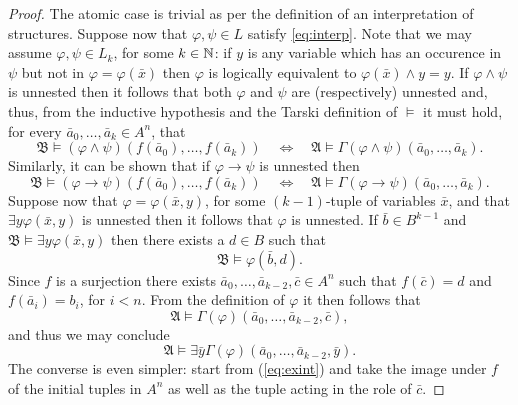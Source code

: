 \begin{proof}
	The atomic case is trivial as per the definition of an interpretation of structures.  Suppose now that $\varphi,\psi\in L$ satisfy \ref{eq:interp}.  Note that we may assume $\varphi,\psi\in L_k$, for some $k\in\mathbb{N}$:  if $y$ is any variable which has an occurence in $\psi$ but not in $\varphi=\varphi(\bar{x})$ then $\varphi$ is logically equivalent to $\varphi(\bar{x})\wedge y=y$.  If $\varphi\wedge\psi$ is unnested then it follows that both $\varphi$ and $\psi$ are (respectively) unnested and, thus, from the inductive hypothesis and the Tarski definition of $\models$ it must hold, for every $\bar{a}_0,\dotsc,\bar{a}_k\in A^n$, that
	\begin{equation}
		\mathfrak{B}\models(\varphi\wedge\psi)(f(\bar{a}_0),\dotsc,f(\bar{a}_k))\quad\iff\quad\mathfrak{A}\models\Gamma(\varphi\wedge\psi)(\bar{a}_0,\dotsc,\bar{a}_k).
	\end{equation}
	Similarly, it can be shown that if $\varphi\rightarrow\psi$ is unnested then
	\begin{equation}
		\mathfrak{B}\models(\varphi\rightarrow\psi)(f(\bar{a}_0),\dotsc,f(\bar{a}_k))\quad\iff\quad\mathfrak{A}\models\Gamma(\varphi\rightarrow\psi)(\bar{a}_0,\dotsc,\bar{a}_k).
	\end{equation}
	 Suppose now that $\varphi=\varphi(\bar{x},y)$, for some $(k-1)$-tuple of variables $\bar{x}$, and that $\exists y\varphi(\bar{x},y)$ is unnested then it follows that $\varphi$ is unnested.  If $\bar{b}\in B^{k-1}$ and $\mathfrak{B}\models\exists y\varphi(\bar{x},y)$ then there exists a $d\in B$ such that
	 \begin{equation}
		 \mathfrak{B}\models\varphi(\bar{b},d).
	 \end{equation}
	 Since $f$ is a surjection there exists $\bar{a}_0,\dotsc,\bar{a}_{k-2},\bar{c}\in A^n$ such that $f(\bar{c})=d$ and $f(\bar{a}_i)=b_i$, for $i<n$.  From the definition of $\varphi$ it then follows that
	 \begin{equation}
		 \mathfrak{A}\models\Gamma(\varphi)(\bar{a}_0,\dotsc,\bar{a}_{k-2},\bar{c}),
	 \end{equation}
	 and thus we may conclude
	 \begin{equation}
		 \mathfrak{A}\models\exists\bar{y}\Gamma(\varphi)(\bar{a}_0,\dotsc,\bar{a}_{k-2},\bar{y}).\label{eq:exint}
	 \end{equation}
	 The converse is even simpler:  start from (\ref{eq:exint}) and take the image under $f$ of the initial tuples in $A^n$ as well as the tuple acting in the role of $\bar{c}$.
\end{proof}

